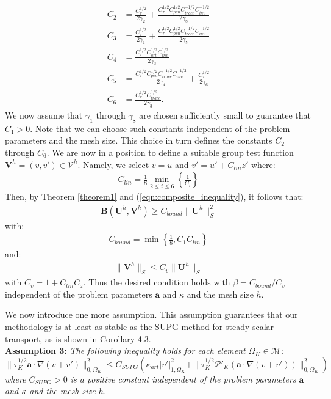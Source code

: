 \documentclass[11pt]{article}
\newenvironment{proof}[1][Proof]{\begin{trivlist}
\item[\hskip \labelsep {\bfseries #1}]}{\end{trivlist}}
\newcommand{\qed}{\nobreak \ifvmode \relax \else
      \ifdim\lastskip<1.5em \hskip-\lastskip
      \hskip1.5em plus0em minus0.5em \fi \nobreak
      \vrule height0.75em width0.5em depth0.25em\fi}
\begin{document}
\begin{proof}
\begin{align}
C_2 &= \frac{C_{\tau}^{1/2}}{2\gamma_2} + \frac{C_{\tau}^{1/2} C_{pen}^{1/2} C_{trace}^{-1/2} C_{inv}^{-1/2}}{2\gamma_8} \nonumber \\
C_3 &= \frac{C_{\tau}^{1/2}}{2\gamma_1} + \frac{C_{\tau}^{1/2} C_{pen}^{1/2} C_{trace}^{-1/2} C_{inv}^{-1/2}}{2\gamma_5} \nonumber \\
C_4 &= \frac{C_{\tau}^{1/2}C_{art}^{1/2}C_{inv}^{1/2}}{2\gamma_3} \nonumber \\
C_5 &= \frac{C_{\tau}^{1/2} C_{pen}^{1/2} C_{trace}^{-1/2} C_{inv}^{-1/2}}{2\gamma_4}+ \frac{C_{\tau}^{1/2}}{2\gamma_6}\nonumber \\
C_6 &=  \frac{C_{\tau}^{1/2}C_{trace}^{1/2}}{2\gamma_3}. \nonumber
\end{align}
We now assume that $\gamma_1$ through $\gamma_8$ are chosen sufficiently small to guarantee that $C_1 > 0$.  Note that we can choose such constants independent of the problem parameters and the mesh size.  This choice in turn defines the constants $C_2$ through $C_6$.  We are now in a position to define a suitable group test function $\textbf{V}^h = (\bar{v},v') \in \bm{\mathcal{V}}^h$.  Namely, we select $\bar{v} = \bar{u}$ and $v' = u' + C_{lin} z'$ where:
\begin{eqnarray}
C_{lin} = \frac{1}{8} \min_{2 \leq i \leq 6}\left\{\frac{1}{C_i}\right\}
\end{eqnarray}
Then, by Theorem \ref{theorem1} and (\ref{eqn:composite_inequality}), it follows that:
\begin{eqnarray}
\textbf{B}(\textbf{U}^h,\textbf{V}^h) \geq C_{bound} \| \textbf{U}^h \|^2_S
\end{eqnarray}
with:
\begin{eqnarray}
C_{bound} = \min \left\{ \frac{1}{8}, C_1 C_{lin} \right\}
\end{eqnarray}
and:
\begin{eqnarray}
\| \textbf{V}^h \|_S \leq C_v \| \textbf{U}^h \|_S
\end{eqnarray}
with $C_v = 1 + C_{lin} C_z$.  Thus the desired condition holds with $\beta = C_{bound}/C_v$ independent of the problem parameters $\bm{a}$ and $\kappa$ and the mesh size $h$. \qed
\end{proof}

We now introduce one more assumption.  This assumption guarantees that our methodology is at least as stable as the SUPG method for steady scalar transport, as is shown in Corollary 4.3.\\

\noindent \textbf{Assumption 3:} \textit{The following inequality holds for each element $\Omega_K \in \mathcal{M}$:
\begin{equation}
\| \tau_K^{1/2} \bm{a} \cdot \nabla \left(\bar{v} + v'\right) \|^2_{0,\Omega_K} \leq C_{SUPG} \left( \kappa_{art} | v' |^2_{1,\Omega_K} + \| \tau_K^{1/2} \mathcal{P}'_K \left( \bm{a} \cdot \nabla \left(\bar{v} + v'\right) \right) \|^2_{0,\Omega_K} \right) \nonumber
\end{equation}
where $C_{SUPG} > 0$ is a positive constant independent of the problem parameters $\bm{a}$ and $\kappa$ and the mesh size $h$.}
\end{document}
